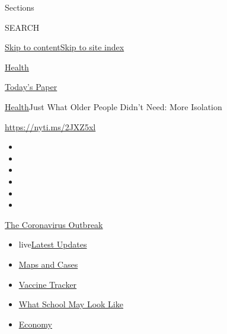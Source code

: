 Sections

SEARCH

\protect\hyperlink{site-content}{Skip to
content}\protect\hyperlink{site-index}{Skip to site index}

\href{https://www.nytimes3xbfgragh.onion/section/health}{Health}

\href{https://myaccount.nytimes3xbfgragh.onion/auth/login?response_type=cookie\&client_id=vi}{}

\href{https://www.nytimes3xbfgragh.onion/section/todayspaper}{Today's
Paper}

\href{/section/health}{Health}\textbar{}Just What Older People Didn't
Need: More Isolation

\url{https://nyti.ms/2JXZ5xl}

\begin{itemize}
\item
\item
\item
\item
\item
\item
\end{itemize}

\href{https://www.nytimes3xbfgragh.onion/news-event/coronavirus?action=click\&pgtype=Article\&state=default\&region=TOP_BANNER\&context=storylines_menu}{The
Coronavirus Outbreak}

\begin{itemize}
\tightlist
\item
  live\href{https://www.nytimes3xbfgragh.onion/2020/08/01/world/coronavirus-covid-19.html?action=click\&pgtype=Article\&state=default\&region=TOP_BANNER\&context=storylines_menu}{Latest
  Updates}
\item
  \href{https://www.nytimes3xbfgragh.onion/interactive/2020/us/coronavirus-us-cases.html?action=click\&pgtype=Article\&state=default\&region=TOP_BANNER\&context=storylines_menu}{Maps
  and Cases}
\item
  \href{https://www.nytimes3xbfgragh.onion/interactive/2020/science/coronavirus-vaccine-tracker.html?action=click\&pgtype=Article\&state=default\&region=TOP_BANNER\&context=storylines_menu}{Vaccine
  Tracker}
\item
  \href{https://www.nytimes3xbfgragh.onion/interactive/2020/07/29/us/schools-reopening-coronavirus.html?action=click\&pgtype=Article\&state=default\&region=TOP_BANNER\&context=storylines_menu}{What
  School May Look Like}
\item
  \href{https://www.nytimes3xbfgragh.onion/live/2020/07/31/business/stock-market-today-coronavirus?action=click\&pgtype=Article\&state=default\&region=TOP_BANNER\&context=storylines_menu}{Economy}
\end{itemize}

